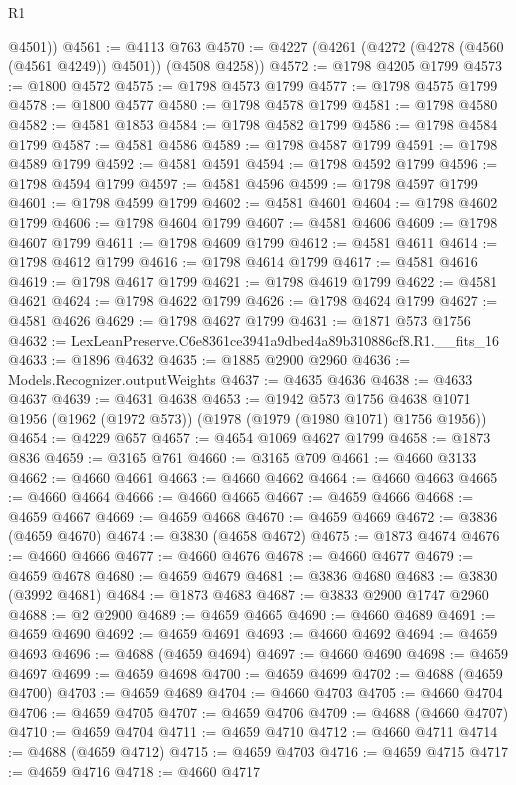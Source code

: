 \begin{lexlean}{R1}
\begin{coremodule}
        @4501))
@4561 := @4113 @763
@4570 := @4227 (@4261 (@4272 (@4278 (@4560 (@4561 @4249)) @4501)) (@4508 @4258))
@4572 := @1798 @4205 @1799
@4573 := @1800 @4572
@4575 := @1798 @4573 @1799
@4577 := @1798 @4575 @1799
@4578 := @1800 @4577
@4580 := @1798 @4578 @1799
@4581 := @1798 @4580
@4582 := @4581 @1853
@4584 := @1798 @4582 @1799
@4586 := @1798 @4584 @1799
@4587 := @4581 @4586
@4589 := @1798 @4587 @1799
@4591 := @1798 @4589 @1799
@4592 := @4581 @4591
@4594 := @1798 @4592 @1799
@4596 := @1798 @4594 @1799
@4597 := @4581 @4596
@4599 := @1798 @4597 @1799
@4601 := @1798 @4599 @1799
@4602 := @4581 @4601
@4604 := @1798 @4602 @1799
@4606 := @1798 @4604 @1799
@4607 := @4581 @4606
@4609 := @1798 @4607 @1799
@4611 := @1798 @4609 @1799
@4612 := @4581 @4611
@4614 := @1798 @4612 @1799
@4616 := @1798 @4614 @1799
@4617 := @4581 @4616
@4619 := @1798 @4617 @1799
@4621 := @1798 @4619 @1799
@4622 := @4581 @4621
@4624 := @1798 @4622 @1799
@4626 := @1798 @4624 @1799
@4627 := @4581 @4626
@4629 := @1798 @4627 @1799
@4631 := @1871 @573 @1756
@4632 := LexLeanPreserve.C6e8361ce3941a9dbed4a89b310886cf8.R1.__fits_16
@4633 := @1896 @4632
@4635 := @1885 @2900 @2960
@4636 := Models.Recognizer.outputWeights
@4637 := @4635 @4636
@4638 := @4633 @4637
@4639 := @4631 @4638
@4653 := @1942
    @573
    @1756
    @4638
    @1071
    @1956
    (@1962 (@1972 @573))
    (@1978 (@1979 (@1980 @1071) @1756 @1956))
@4654 := @4229 @657
@4657 := @4654 @1069 @4627 @1799
@4658 := @1873 @836
@4659 := @3165 @761
@4660 := @3165 @709
@4661 := @4660 @3133
@4662 := @4660 @4661
@4663 := @4660 @4662
@4664 := @4660 @4663
@4665 := @4660 @4664
@4666 := @4660 @4665
@4667 := @4659 @4666
@4668 := @4659 @4667
@4669 := @4659 @4668
@4670 := @4659 @4669
@4672 := @3836 (@4659 @4670)
@4674 := @3830 (@4658 @4672)
@4675 := @1873 @4674
@4676 := @4660 @4666
@4677 := @4660 @4676
@4678 := @4660 @4677
@4679 := @4659 @4678
@4680 := @4659 @4679
@4681 := @3836 @4680
@4683 := @3830 (@3992 @4681)
@4684 := @1873 @4683
@4687 := @3833 @2900 @1747 @2960
@4688 := @2 @2900
@4689 := @4659 @4665
@4690 := @4660 @4689
@4691 := @4659 @4690
@4692 := @4659 @4691
@4693 := @4660 @4692
@4694 := @4659 @4693
@4696 := @4688 (@4659 @4694)
@4697 := @4660 @4690
@4698 := @4659 @4697
@4699 := @4659 @4698
@4700 := @4659 @4699
@4702 := @4688 (@4659 @4700)
@4703 := @4659 @4689
@4704 := @4660 @4703
@4705 := @4660 @4704
@4706 := @4659 @4705
@4707 := @4659 @4706
@4709 := @4688 (@4660 @4707)
@4710 := @4659 @4704
@4711 := @4659 @4710
@4712 := @4660 @4711
@4714 := @4688 (@4659 @4712)
@4715 := @4659 @4703
@4716 := @4659 @4715
@4717 := @4659 @4716
@4718 := @4660 @4717

\end{coremodule}
\end{lexlean}
